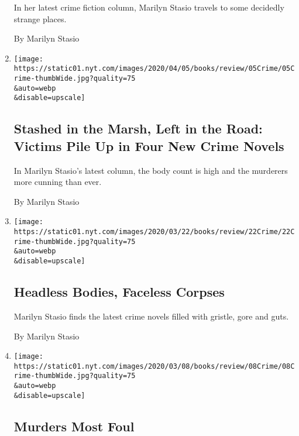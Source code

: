 \begin{enumerate}
  In her latest crime fiction column, Marilyn Stasio travels to some
  decidedly strange places.

  By Marilyn Stasio
\item
  \href{/2020/04/03/books/review/crime-fiction-peter-swanson-eight-perfect-murders.html}{}

  \texttt{[image: https://static01.nyt.com/images/2020/04/05/books/review/05Crime/05Crime-thumbWide.jpg?quality=75\\\&auto=webp\\\&disable=upscale]}

  \hypertarget{stashed-in-the-marsh-left-in-the-road-victims-pile-up-in-four-new-crime-novels}{%
  \subsection{Stashed in the Marsh, Left in the Road: Victims Pile Up in
  Four New Crime
  Novels}\label{stashed-in-the-marsh-left-in-the-road-victims-pile-up-in-four-new-crime-novels}}

  In Marilyn Stasio's latest column, the body count is high and the
  murderers more cunning than ever.

  By Marilyn Stasio
\item
  \href{/2020/03/20/books/review/crime-fiction-donna-leon.html}{}

  \texttt{[image: https://static01.nyt.com/images/2020/03/22/books/review/22Crime/22Crime-thumbWide.jpg?quality=75\\\&auto=webp\\\&disable=upscale]}

  \hypertarget{headless-bodies-faceless-corpses}{%
  \subsection{Headless Bodies, Faceless
  Corpses}\label{headless-bodies-faceless-corpses}}

  Marilyn Stasio finds the latest crime novels filled with gristle, gore
  and guts.

  By Marilyn Stasio
\item
  \href{/2020/03/06/books/review/truants-kate-weinberg-new-crime-fiction.html}{}

  \texttt{[image: https://static01.nyt.com/images/2020/03/08/books/review/08Crime/08Crime-thumbWide.jpg?quality=75\\\&auto=webp\\\&disable=upscale]}

  \hypertarget{murders-most-foul}{%
  \subsection{Murders Most Foul}\label{murders-most-foul}}


\end{enumerate}
